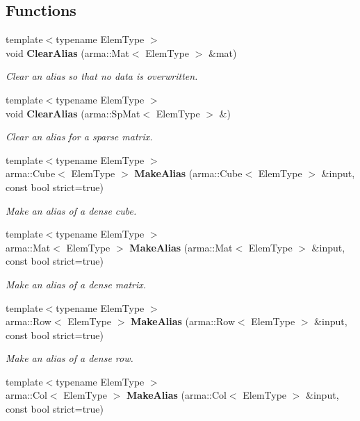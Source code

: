 \subsection*{Functions}
\begin{DoxyCompactItemize}
\item 
{\footnotesize template$<$typename Elem\+Type $>$ }\\void \textbf{ Clear\+Alias} (arma\+::\+Mat$<$ Elem\+Type $>$ \&mat)
\begin{DoxyCompactList}\small\item\em Clear an alias so that no data is overwritten. \end{DoxyCompactList}\item 
{\footnotesize template$<$typename Elem\+Type $>$ }\\void \textbf{ Clear\+Alias} (arma\+::\+Sp\+Mat$<$ Elem\+Type $>$ \&)
\begin{DoxyCompactList}\small\item\em Clear an alias for a sparse matrix. \end{DoxyCompactList}\item 
{\footnotesize template$<$typename Elem\+Type $>$ }\\arma\+::\+Cube$<$ Elem\+Type $>$ \textbf{ Make\+Alias} (arma\+::\+Cube$<$ Elem\+Type $>$ \&input, const bool strict=true)
\begin{DoxyCompactList}\small\item\em Make an alias of a dense cube. \end{DoxyCompactList}\item 
{\footnotesize template$<$typename Elem\+Type $>$ }\\arma\+::\+Mat$<$ Elem\+Type $>$ \textbf{ Make\+Alias} (arma\+::\+Mat$<$ Elem\+Type $>$ \&input, const bool strict=true)
\begin{DoxyCompactList}\small\item\em Make an alias of a dense matrix. \end{DoxyCompactList}\item 
{\footnotesize template$<$typename Elem\+Type $>$ }\\arma\+::\+Row$<$ Elem\+Type $>$ \textbf{ Make\+Alias} (arma\+::\+Row$<$ Elem\+Type $>$ \&input, const bool strict=true)
\begin{DoxyCompactList}\small\item\em Make an alias of a dense row. \end{DoxyCompactList}\item 
{\footnotesize template$<$typename Elem\+Type $>$ }\\arma\+::\+Col$<$ Elem\+Type $>$ \textbf{ Make\+Alias} (arma\+::\+Col$<$ Elem\+Type $>$ \&input, const bool strict=true)

\end{DoxyCompactItemize}
